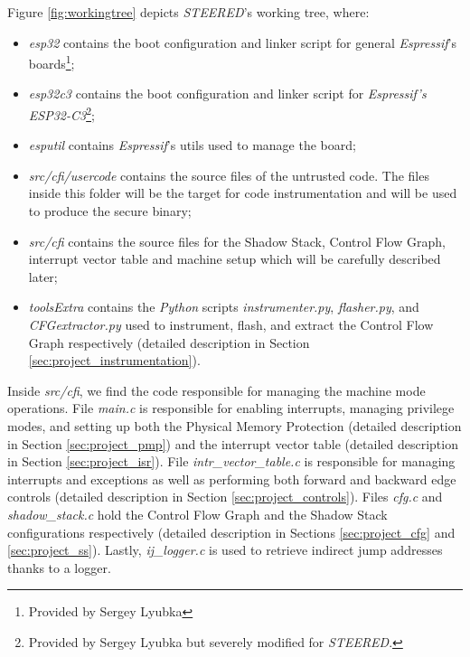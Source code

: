 Figure \ref{fig:workingtree} depicts \textit{STEERED}'s working tree, where:

\begin{itemize}
  \item \textit{esp32} contains the boot configuration and linker script for
    general \textit{Espressif}'s boards\footnote{Provided by Sergey Lyubka};

  \item \textit{esp32c3} contains the boot configuration and linker script for
    \textit{Espressif's ESP32-C3}\footnote{Provided by Sergey Lyubka but
    severely modified for \textit{STEERED}.};

  \item \textit{esputil} contains \textit{Espressif}'s utils used to manage the board;

  \item \textit{src/cfi/usercode} contains the source files of the untrusted
    code. The files inside this folder will be the target for code instrumentation
    and will be used to produce the secure binary;

  \item \textit{src/cfi} contains the source files for the Shadow Stack, Control
    Flow Graph, interrupt vector table and machine setup which will be carefully
    described later;

  \item \textit{toolsExtra} contains the \textit{Python} scripts \textit{instrumenter.py},
    \textit{flasher.py}, and \textit{CFGextractor.py} used to instrument, flash,
    and extract the Control Flow Graph respectively (detailed description in Section
    \ref{sec:project_instrumentation}).
\end{itemize}

Inside \textit{src/cfi}, we find the code responsible for managing the machine
mode operations. File \textit{main.c} is responsible for enabling interrupts, managing
privilege modes, and setting up both the Physical Memory Protection (detailed description
in Section \ref{sec:project_pmp}) and the interrupt vector table (detailed description
in Section \ref{sec:project_isr}). File \textit{intr\_vector\_table.c} is
responsible for managing interrupts and exceptions as well as performing both
forward and backward edge controls (detailed description in Section \ref{sec:project_controls}).
Files \textit{cfg.c} and \textit{shadow\_stack.c} hold the Control Flow Graph and
the Shadow Stack configurations respectively (detailed description in Sections
\ref{sec:project_cfg} and \ref{sec:project_ss}). Lastly, \textit{ij\_logger.c}
is used to retrieve indirect jump addresses thanks to a logger.

